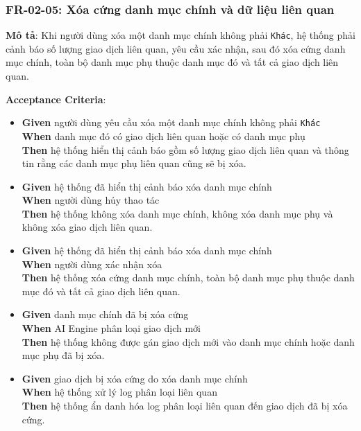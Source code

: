\subsubsection{FR-02-05: Xóa cứng danh mục chính và dữ liệu liên quan}

\textbf{Mô tả}: Khi người dùng xóa một danh mục chính không phải \texttt{Khác}, hệ thống phải cảnh báo số lượng giao dịch liên quan, yêu cầu xác nhận, sau đó xóa cứng danh mục chính, toàn bộ danh mục phụ thuộc danh mục đó và tất cả giao dịch liên quan.



\textbf{Acceptance Criteria}:

\begin{itemize}
\item \textbf{Given} người dùng yêu cầu xóa một danh mục chính không phải \texttt{Khác}  \\ \hspace*{1.5em}  \textbf{When} danh mục đó có giao dịch liên quan hoặc có danh mục phụ  \\ \hspace*{1.5em}  \textbf{Then} hệ thống hiển thị cảnh báo gồm số lượng giao dịch liên quan và thông tin rằng các danh mục phụ liên quan cũng sẽ bị xóa.
\item \textbf{Given} hệ thống đã hiển thị cảnh báo xóa danh mục chính  \\ \hspace*{1.5em}  \textbf{When} người dùng hủy thao tác  \\ \hspace*{1.5em}  \textbf{Then} hệ thống không xóa danh mục chính, không xóa danh mục phụ và không xóa giao dịch liên quan.
\item \textbf{Given} hệ thống đã hiển thị cảnh báo xóa danh mục chính  \\ \hspace*{1.5em}  \textbf{When} người dùng xác nhận xóa  \\ \hspace*{1.5em}  \textbf{Then} hệ thống xóa cứng danh mục chính, toàn bộ danh mục phụ thuộc danh mục đó và tất cả giao dịch liên quan.
\item \textbf{Given} danh mục chính đã bị xóa cứng  \\ \hspace*{1.5em}  \textbf{When} AI Engine phân loại giao dịch mới  \\ \hspace*{1.5em}  \textbf{Then} hệ thống không được gán giao dịch mới vào danh mục chính hoặc danh mục phụ đã bị xóa.
\item \textbf{Given} giao dịch bị xóa cứng do xóa danh mục chính  \\ \hspace*{1.5em}  \textbf{When} hệ thống xử lý log phân loại liên quan  \\ \hspace*{1.5em}  \textbf{Then} hệ thống ẩn danh hóa log phân loại liên quan đến giao dịch đã bị xóa cứng.
\end{itemize}
